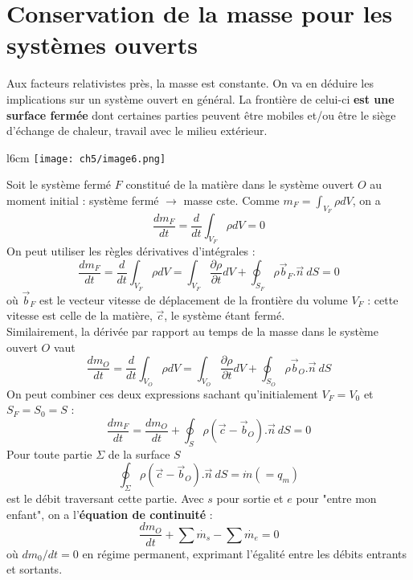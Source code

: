 \section{Conservation de la masse pour les systèmes ouverts}
Aux facteurs relativistes près, la masse est constante. On va en 
déduire les implications sur un système ouvert en général. La frontière 
de celui-ci \textbf{est une surface fermée} dont certaines parties 
peuvent être mobiles et/ou être le siège d'échange de chaleur, travail 
avec le milieu extérieur.\\
\begin{wrapfigure}[13]{l}{6cm}
	\texttt{[image: ch5/image6.png]}
\end{wrapfigure}
Soit le système fermé $F$ constitué de la matière dans le système 
ouvert $O$ au moment initial : système fermé $\rightarrow$ masse cste. 
Comme $m_F = \int_{V_F} \rho dV$, on a
\begin{equation}
\frac{dm_F}{dt} = \frac{d}{dt}\int_{V_F} \rho dV = 0
\end{equation}
On peut utiliser les règles dérivatives d'intégrales :
\begin{equation}
\frac{dm_F}{dt}=\frac{d}{dt}\int_{V_F}\rho dV = \int_{V_F}\frac{\partial 
\rho}{\partial t}dV + \oint_{S_F} \rho\vec{b}_F.\vec{n}\ dS = 0
\end{equation}
où $\vec{b}_F$ est le vecteur vitesse de déplacement de la frontière 
du volume $V_F$ : cette vitesse est celle de la matière, $\vec{c}$, le système 
étant fermé.\\
Similairement, la dérivée par rapport au temps de la masse dans le 
système ouvert $O$ vaut 
\begin{equation}
\frac{dm_O}{dt}=\frac{d}{dt}\int_{V_O}\rho dV = \int_{V_O}\frac{\partial 
\rho}{\partial t}dV + \oint_{S_O} \rho\vec{b}_O.\vec{n}\ dS
\end{equation}
On peut combiner ces deux expressions sachant qu'initialement $V_F=V_0$ 
et $S_F=S_0=S$ :
\begin{equation}
\frac{dm_F}{dt} = \frac{dm_O}{dt} + \oint_S\rho(\vec{c}-\vec{b}_O).\vec 
n\ dS =0
\end{equation}
Pour toute partie $\Sigma$ de la surface $S$
\begin{equation}
\oint_\Sigma \rho(\vec{c}-\vec{b}_O).\vec{n}\ dS = \dot{m} (=q_m)
\end{equation}
est le débit traversant cette partie. Avec $s$ pour sortie et $e$ pour 
"entre mon enfant", on a l'\textbf{équation de continuité} :
\begin{equation}
\frac{dm_O}{dt} + \sum \dot{m_s} - \sum \dot{m_e} = 0
\end{equation}
où $dm_0/dt=0$ en régime permanent, exprimant l'égalité entre les débits 
entrants et sortants.

